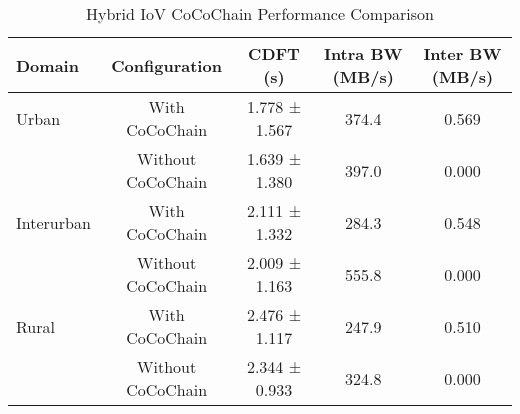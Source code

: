 
\begin{table}[h]
\centering
\caption{Hybrid IoV CoCoChain Performance Comparison}
\label{tab:hybrid_iov_performance}
\begin{tabular}{|l|c|c|c|c|}
\hline
\textbf{Domain} & \textbf{Configuration} & \textbf{CDFT (s)} & \textbf{Intra BW (MB/s)} & \textbf{Inter BW (MB/s)} \\
\hline
Urban & With CoCoChain & 1.778 ± 1.567 & 374.4 & 0.569 \\
 & Without CoCoChain & 1.639 ± 1.380 & 397.0 & 0.000 \\
\hline
Interurban & With CoCoChain & 2.111 ± 1.332 & 284.3 & 0.548 \\
 & Without CoCoChain & 2.009 ± 1.163 & 555.8 & 0.000 \\
\hline
Rural & With CoCoChain & 2.476 ± 1.117 & 247.9 & 0.510 \\
 & Without CoCoChain & 2.344 ± 0.933 & 324.8 & 0.000 \\
\hline
\end{tabular}
\end{table}

